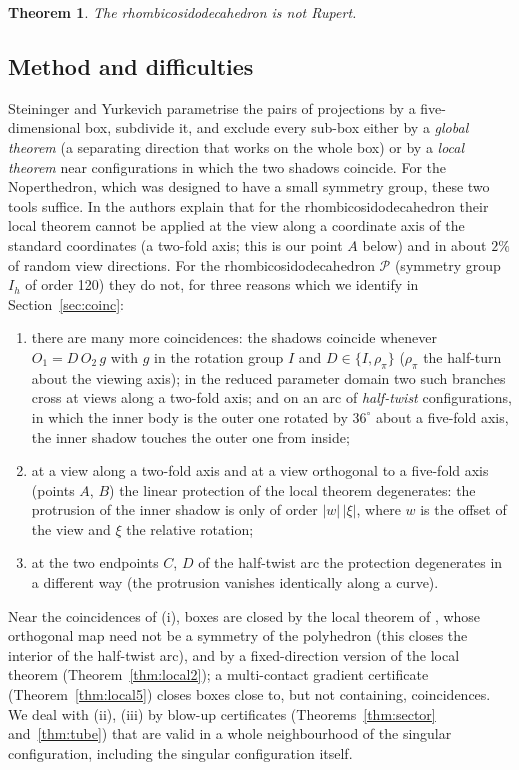 \documentclass[11pt]{amsart}
\newtheorem{theorem}{Theorem}[section]
\theoremstyle{definition}
\newcommand{\abs}[1]{\lvert #1\rvert}
\newcommand{\RID}{\mathcal{P}}
\newcommand{\Ih}{I_h}
\begin{document}
\begin{theorem}\label{thm:main}
The rhombicosidodecahedron is not Rupert.
\end{theorem}

\subsection*{Method and difficulties}
Steininger and Yurkevich \cite{SY25} parametrise the pairs of projections by a five-dimensional box, subdivide it,
and exclude every sub-box either by a \emph{global theorem} (a separating direction that works on the whole box) or by
a \emph{local theorem} near configurations in which the two shadows coincide. For the Noperthedron, which was
designed to have a small symmetry group, these two tools suffice. In \cite[Section 9.1]{SY25} the authors explain
that for the rhombicosidodecahedron their local theorem cannot be applied at the view along a coordinate axis of the
standard coordinates (a two-fold axis; this is our point $A$ below) and in about $2\%$ of random view directions. For the rhombicosidodecahedron $\RID$ (symmetry group
$\Ih$ of order 120) they do not, for three reasons which we identify in Section~\ref{sec:coinc}:
\begin{enumerate}[label=(\roman*)]
\item there are many more coincidences: the shadows coincide whenever $O_1=D\,O_2\,g$ with $g$ in the rotation group
  $I$ and $D\in\{I,\rho_\pi\}$ ($\rho_\pi$ the half-turn about the viewing axis); in the reduced parameter domain two
  such branches cross at views along a two-fold axis; and on an arc of \emph{half-twist} configurations, in which the
  inner body is the outer one rotated by $36^\circ$ about a five-fold axis, the inner shadow touches the outer one
  from inside;
\item at a view along a two-fold axis and at a view orthogonal to a five-fold axis (points $A$, $B$) the linear
  protection of the local theorem degenerates: the protrusion of the inner shadow is only of order
  $\abs{w}\,\abs{\xi}$, where $w$ is the offset of the view and $\xi$ the relative rotation;
\item at the two endpoints $C$, $D$ of the half-twist arc the protection degenerates in a different way (the
  protrusion vanishes identically along a curve).
\end{enumerate}
Near the coincidences of (i), boxes are closed by the local theorem of \cite{SY25}, whose orthogonal map need not be a
symmetry of the polyhedron (this closes the interior of the half-twist arc), and by a fixed-direction version of the
local theorem (Theorem~\ref{thm:local2}); a multi-contact gradient certificate (Theorem~\ref{thm:local5}) closes boxes
close to, but not containing, coincidences. We deal with (ii), (iii) by blow-up certificates (Theorems~\ref{thm:sector} and~\ref{thm:tube}) that are valid in a whole neighbourhood of the
singular configuration, including the singular configuration itself.
\end{document}
